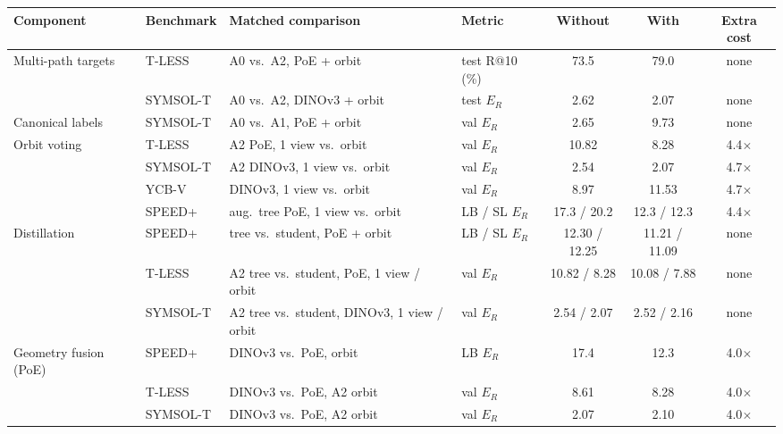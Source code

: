 \begin{tabular}{@{}l l l l cc c@{}}
\toprule
Component & Benchmark & Matched comparison & Metric & Without & With & Extra cost \\
\midrule
Multi-path targets & T-LESS & A0 vs.\ A2, PoE + orbit & test R@10 (\%) & 73.5 & 79.0 & none \\  %
 & SYMSOL-T & A0 vs.\ A2, DINOv3 + orbit & test $E_R$ & 2.62 & 2.07 & none \\  %
\addlinespace[2pt]
Canonical labels & SYMSOL-T & A0 vs.\ A1, PoE + orbit & val $E_R$ & 2.65 & 9.73 & none \\  %
\addlinespace[2pt]
Orbit voting & T-LESS & A2 PoE, 1 view vs.\ orbit & val $E_R$ & 10.82 & 8.28 & 4.4$\times$ \\  %
 & SYMSOL-T & A2 DINOv3, 1 view vs.\ orbit & val $E_R$ & 2.54 & 2.07 & 4.7$\times$ \\  %
 & YCB-V & DINOv3, 1 view vs.\ orbit & val $E_R$ & 8.97 & 11.53 & 4.7$\times$ \\  %
 & SPEED+ & aug.\ tree PoE, 1 view vs.\ orbit & LB / SL $E_R$ & 17.3 / 20.2 & 12.3 / 12.3 & 4.4$\times$ \\  %
\addlinespace[2pt]
Distillation & SPEED+ & tree vs.\ student, PoE + orbit & LB / SL $E_R$ & 12.30 / 12.25 & 11.21 / 11.09 & none \\  %
 & T-LESS & A2 tree vs.\ student, PoE, 1 view / orbit & val $E_R$ & 10.82 / 8.28 & 10.08 / 7.88 & none \\  %
 & SYMSOL-T & A2 tree vs.\ student, DINOv3, 1 view / orbit & val $E_R$ & 2.54 / 2.07 & 2.52 / 2.16 & none \\  %
\addlinespace[2pt]
Geometry fusion (PoE) & SPEED+ & DINOv3 vs.\ PoE, orbit & LB $E_R$ & 17.4 & 12.3 & 4.0$\times$ \\  %
 & T-LESS & DINOv3 vs.\ PoE, A2 orbit & val $E_R$ & 8.61 & 8.28 & 4.0$\times$ \\  %
 & SYMSOL-T & DINOv3 vs.\ PoE, A2 orbit & val $E_R$ & 2.07 & 2.10 & 4.0$\times$ \\  %

\end{tabular}
